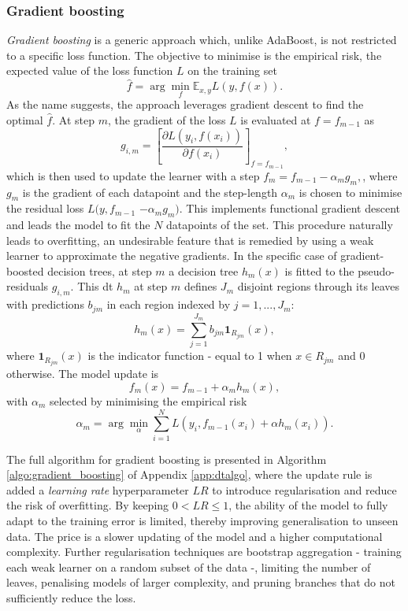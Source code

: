\subsubsection{Gradient boosting}\label{sec-gradient-boost}
\textit{Gradient boosting} is a generic approach which, unlike AdaBoost, is not restricted to a specific loss function. The objective to minimise is the empirical risk, the expected value of the loss function $L$ on the training set 
\begin{equation}\label{eq:empRisk}
    \hat{f}  = \arg \min_f \mathbb{E}_{x,y} L(y, f(x)).
\end{equation}
As the name suggests, the approach leverages gradient descent to find the optimal $\hat{f}$. At step $m$, the gradient of the loss $L$ is evaluated at $f = f_{m-1}$ as \[ g_{i,m} = \left[ \frac{\partial  L(y_i, f(x_i))}{\partial f(x_i)} \right]_{f= f_{m-1}}, \] which is then used to update the learner with a step $f_m = f_{m-1} - \alpha_m g_{m},$, where $g_m$ is the gradient of each datapoint and the step-length $\alpha_m$ is chosen to minimise the residual loss $L(y, f_{m-1}$ $- \alpha_m g_{m})$. This implements functional gradient descent and leads the model to fit the $N$ datapoints of the set. This procedure naturally leads to overfitting, an undesirable feature that is remedied by using a weak learner to approximate the negative gradients. In the specific case of gradient-boosted decision trees, at step $m$ a decision tree $h_m(x)$ is fitted to the pseudo-residuals $g_{i,m}$. This \gls{dt} $h_m$ at step $m$ defines $J_m$ disjoint regions through its leaves with predictions $b_{jm}$ in each region indexed by $j = 1, ..., J_m$: \[ h_m(x) = \sum_{j=1}^{J_m} b_{jm} \textbf{1}_{R_{jm}}(x),\] where $\textbf{1}_{R_{jm}}(x)$ is the indicator function - equal to 1 when $x \in R_{jm}$ and 0 otherwise. The model update is \[f_m(x) = f_{m-1} + \alpha_m h_m(x),\] with $\alpha_m$ selected by minimising the empirical risk \[ \alpha_m = \arg \min_{\alpha} \sum_{i=1}^N L\left(y_i, f_{m-1}(x_i) + \alpha h_m(x_i)\right).\]

The full algorithm for gradient boosting is presented in Algorithm \ref{algo:gradient_boosting} of Appendix \ref{app:dtalgo}, where the update rule is added a \textit{learning rate} hyperparameter $LR$ to introduce regularisation and reduce the risk of overfitting. By keeping $0 < LR \leq 1$, the ability of the model to fully adapt to the training error is limited, thereby improving generalisation to unseen data. The price is a slower updating of the model and a higher computational complexity. Further regularisation techniques are bootstrap aggregation - training each weak learner on a random subset of the data -, limiting the number of leaves, penalising models of larger complexity, and pruning branches that do not sufficiently reduce the loss. \\

